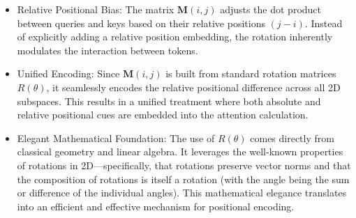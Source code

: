 \begin{itemize}
	\item Relative Positional Bias:  
  The matrix \(\mathbf{M}(i,j)\) adjusts the dot product between queries and keys based on their relative positions \((j-i)\). Instead of explicitly adding a relative position embedding, the rotation inherently modulates the interaction between tokens.
	\item Unified Encoding: Since \(\mathbf{M}(i,j)\) is built from standard rotation matrices \(R(\theta)\), it seamlessly encodes the relative positional difference across all 2D subspaces. This results in a unified treatment where both absolute and relative positional cues are embedded into the attention calculation.
	\item Elegant Mathematical Foundation: The use of \(R(\theta)\) comes directly from classical geometry and linear algebra. It leverages the well-known properties of rotations in 2D—specifically, that rotations preserve vector norms and that the composition of rotations is itself a rotation (with the angle being the sum or difference of the individual angles). This mathematical elegance translates into an efficient and effective mechanism for positional encoding.
\end{itemize}



